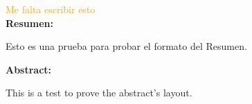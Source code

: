 \newpage



\textcolor{orange}{\huge Me falta escribir esto\\}
{\bfseries \large Resumen:} \vspace{5mm}


Esto es una prueba para probar el formato del Resumen.
\vspace{1cm}

\begin{otherlanguage}{english}
{\bfseries \large Abstract: }\vspace{5mm}


This is a test to prove the abstract's layout.
\vspace{1cm}
\end{otherlanguage}


\newpage